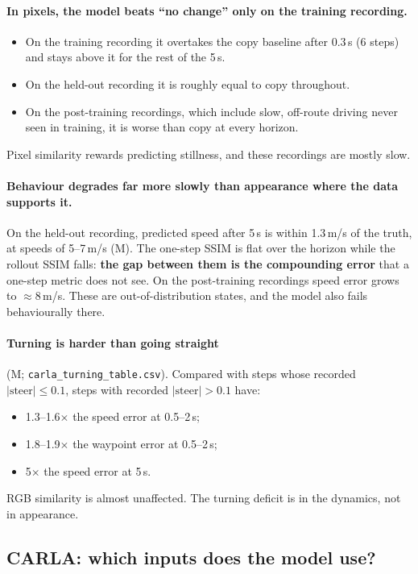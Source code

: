 \documentclass[11pt]{article}
\begin{document}
\paragraph{In pixels, the model beats ``no change'' only on the training recording.}
\begin{itemize}
  \item On the training recording it overtakes the copy baseline after 0.3\,s (6 steps) and stays above it for the rest of the 5\,s.
  \item On the held-out recording it is roughly equal to copy throughout.
  \item On the post-training recordings, which include slow, off-route driving never seen in training, it is worse than copy at every horizon.
\end{itemize}
Pixel similarity rewards predicting stillness, and these recordings are mostly slow.

\paragraph{Behaviour degrades far more slowly than appearance where the data supports it.} On the held-out recording, predicted speed after 5\,s is within 1.3\,m/s of the truth, at speeds of 5--7\,m/s (M). The one-step SSIM is flat over the horizon while the rollout SSIM falls: \textbf{the gap between them is the compounding error} that a one-step metric does not see. On the post-training recordings speed error grows to $\approx$8\,m/s. These are out-of-distribution states, and the model also fails behaviourally there.

\paragraph{Turning is harder than going straight} (M; \texttt{carla\_turning\_table.csv}). Compared with steps whose recorded $|\text{steer}| \le 0.1$, steps with recorded $|\text{steer}| > 0.1$ have:
\begin{itemize}
  \item 1.3--1.6$\times$ the speed error at 0.5--2\,s;
  \item 1.8--1.9$\times$ the waypoint error at 0.5--2\,s;
  \item 5$\times$ the speed error at 5\,s.
\end{itemize}
RGB similarity is almost unaffected. The turning deficit is in the dynamics, not in appearance.

\subsection{CARLA: which inputs does the model use?}
\label{sec:sensitivity}
\end{document}
